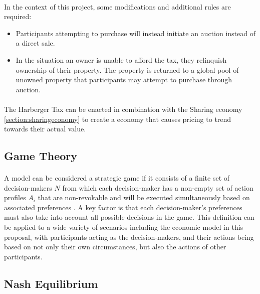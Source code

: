 \paragraph{} In the context of this project, some modifications and additional rules are required:

\begin{itemize}
  \item Participants attempting to purchase will instead initiate an auction instead of a direct sale.
  \item In the situation an owner is unable to afford the tax, they relinquish ownership of their property. The property is returned to a global pool of unowned property that participants may attempt to purchase through auction.
\end{itemize}

\paragraph{} The Harberger Tax can be enacted in combination with the Sharing economy \ref{section:sharingeconomy} to create a economy that causes pricing to trend towards their actual value.

\subsection{Game Theory} 

\paragraph{} A model can be considered a strategic game if it consists of a finite set of decision-makers $N$ from which each decision-maker has a non-empty set of action profiles $A_i$ that are non-revokable and will be executed simultaneously based on associated preferences \cite[Definition 11.1]{osborne1994}. A key factor is that each decision-maker's preferences must also take into account all possible decisions in the game. This definition can be applied to a wide variety of scenarios including the economic model in this proposal, with participants acting as the decision-makers, and their actions being based on not only their own circumstances, but also the actions of other participants.

\subsection{Nash Equilibrium} \label{section:nash}

